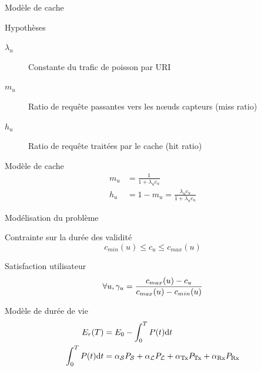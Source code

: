 \begin{frame}{Modèle de cache}
  \begin{block}{Hypothèses}
    \begin{description}
      \item[$\lambda_u$] Constante du trafic de poisson par URI
      \item[$m_u$] Ratio de requête passantes vers les nœuds capteurs (miss ratio)
      \item[$h_u$] Ratio de requête traitées par le cache (hit ratio)
    \end{description}
  \end{block}
  \begin{alertblock}{Modèle de cache}
    \begin{align}
      m_u &= \frac{1}{1 + \lambda_u c_u}
      \label{cache:eq:cache_miss}\\
      h_u &= 1 - m_u = \frac{\lambda_u c_u}{1 + \lambda_u c_u}
      \label{cache:eq:cache_hit}
    \end{align}
  \end{alertblock}
\end{frame}

\begin{frame}{Modélisation du problème}

  \begin{block}{Contrainte sur la durée des validité}
    \[ c_{min}(u) \leq c_u \leq c_{max}(u)\]
  \end{block}
  \begin{block}{Satisfaction utilisateur}
    $$\forall u, \gamma_u = \dfrac{c_{max}(u) - c_u}{c_{max}(u) - c_{min}(u)}$$
  \end{block}

  \begin{alertblock}{Modèle de durée de vie}
    \begin{align}
      E_r(T) &= E_0 - \int_0^T P(t) \mathrm{d}t\\
      \int_0^T P(t) \mathrm{d}t &= \alpha_{\mathcal{S}} P_{\mathcal{S}} + \alpha_{\mathcal{L}} P_{\mathcal{L}} + \alpha_{\textrm{Tx}} P_{\textrm{Tx}} + \alpha_{\textrm{Rx}} P_{\textrm{Rx}}
    \end{align}
  \end{alertblock}

\end{frame}

